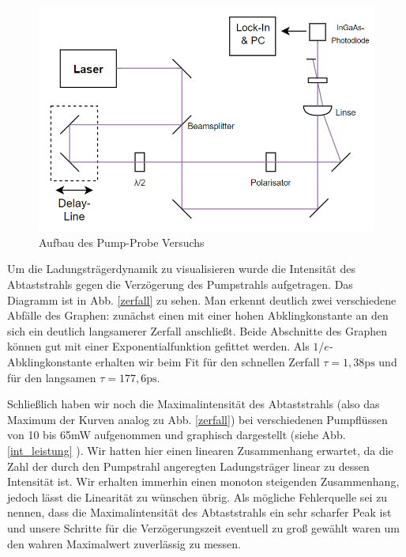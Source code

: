 \begin{figure}[h]
	\begin{center}
		\includegraphics[width=14cm]{Abb/pumpprobe_aufbau.png}
		\caption{Aufbau des Pump-Probe Versuchs}
		\label{pp_aufbau}
	\end{center}
\end{figure}

Um die Ladungsträgerdynamik zu visualisieren wurde die Intensität des Abtaststrahls gegen die Verzögerung des Pumpstrahls aufgetragen. Das Diagramm ist in Abb. \ref{zerfall} zu sehen. Man erkennt deutlich zwei verschiedene Abfälle des Graphen: zunächst einen mit einer hohen Abklingkonstante an den sich ein deutlich langsamerer Zerfall anschließt. Beide Abschnitte des Graphen können gut mit einer Exponentialfunktion gefittet werden. Als $1/e$-Abklingkonstante erhalten wir beim Fit für den schnellen Zerfall $\tau=1,38\si{\pico\second}$ und für den langsamen $\tau=177,6\si{\pico\second}$. 

Schließlich haben wir noch die Maximalintensität des Abtaststrahls (also das Maximum der Kurven analog zu Abb. \ref{zerfall}) bei verschiedenen Pumpflüssen von 10 bis 65mW aufgenommen und graphisch dargestellt (siehe Abb. \ref{int_leistung} ). Wir hatten hier einen linearen Zusammenhang erwartet, da die Zahl der durch den Pumpstrahl angeregten Ladungsträger linear zu dessen Intensität ist. Wir erhalten immerhin einen monoton steigenden Zusammenhang, jedoch lässt die Linearität zu wünschen übrig. Als mögliche Fehlerquelle sei zu nennen, dass die Maximalintensität des Abtaststrahls ein sehr scharfer Peak ist und unsere Schritte für die Verzögerungszeit eventuell zu groß gewählt waren um den wahren Maximalwert zuverlässig zu messen.

